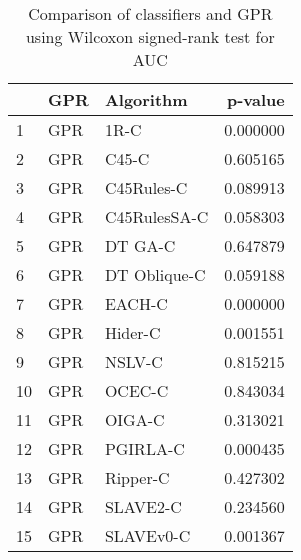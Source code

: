 \begin{table}
\footnotesize
\caption{Comparison of classifiers and GPR using Wilcoxon signed-rank test for AUC}
\label{tab:GPR wilcoxon AUC comparison}
\begin{tabular}{lllr}
\hline
 & GPR & Algorithm & p-value \\
\hline
1 & GPR & 1R-C & 0.000000 \\
2 & GPR & C45-C & 0.605165 \\
3 & GPR & C45Rules-C & 0.089913 \\
4 & GPR & C45RulesSA-C & 0.058303 \\
5 & GPR & DT GA-C & 0.647879 \\
6 & GPR & DT Oblique-C & 0.059188 \\
7 & GPR & EACH-C & 0.000000 \\
8 & GPR & Hider-C & 0.001551 \\
9 & GPR & NSLV-C & 0.815215 \\
10 & GPR & OCEC-C & 0.843034 \\
11 & GPR & OIGA-C & 0.313021 \\
12 & GPR & PGIRLA-C & 0.000435 \\
13 & GPR & Ripper-C & 0.427302 \\
14 & GPR & SLAVE2-C & 0.234560 \\
15 & GPR & SLAVEv0-C & 0.001367 \\
\hline
\end{tabular}
\end{table}
